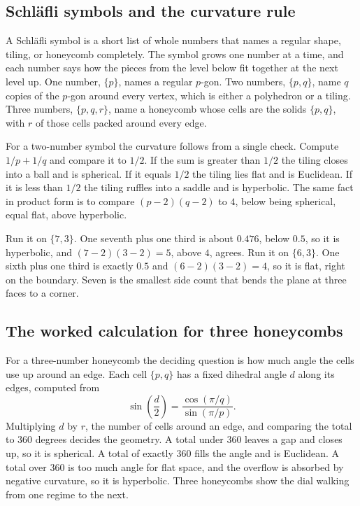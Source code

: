 \subsection{Schl\"afli symbols and the curvature rule}

A Schl\"afli symbol is a short list of whole numbers that names a regular shape, tiling, or honeycomb
completely. The symbol grows one number at a time, and each number says how the pieces from the level below
fit together at the next level up. One number, $\{p\}$, names a regular $p$-gon. Two numbers, $\{p,q\}$,
name $q$ copies of the $p$-gon around every vertex, which is either a polyhedron or a tiling. Three numbers,
$\{p,q,r\}$, name a honeycomb whose cells are the solids $\{p,q\}$, with $r$ of those cells packed around
every edge.

For a two-number symbol the curvature follows from a single check. Compute $1/p + 1/q$ and compare it to
$1/2$. If the sum is greater than $1/2$ the tiling closes into a ball and is spherical. If it equals $1/2$
the tiling lies flat and is Euclidean. If it is less than $1/2$ the tiling ruffles into a saddle and is
hyperbolic. The same fact in product form is to compare $(p-2)(q-2)$ to $4$, below being spherical, equal
flat, above hyperbolic.

Run it on $\{7,3\}$. One seventh plus one third is about $0.476$, below $0.5$, so it is hyperbolic, and
$(7-2)(3-2) = 5$, above $4$, agrees. Run it on $\{6,3\}$. One sixth plus one third is exactly $0.5$ and
$(6-2)(3-2) = 4$, so it is flat, right on the boundary. Seven is the smallest side count that bends the
plane at three faces to a corner.

\subsection{The worked calculation for three honeycombs}

For a three-number honeycomb the deciding question is how much angle the cells use up around an edge. Each
cell $\{p,q\}$ has a fixed dihedral angle $d$ along its edges, computed from
\begin{equation}
\sin\!\left(\frac{d}{2}\right) = \frac{\cos(\pi/q)}{\sin(\pi/p)}.
\end{equation}
Multiplying $d$ by $r$, the number of cells around an edge, and comparing the total to $360$ degrees decides
the geometry. A total under $360$ leaves a gap and closes up, so it is spherical. A total of exactly $360$
fills the angle and is Euclidean. A total over $360$ is too much angle for flat space, and the overflow is
absorbed by negative curvature, so it is hyperbolic. Three honeycombs show the dial walking from one regime
to the next.

